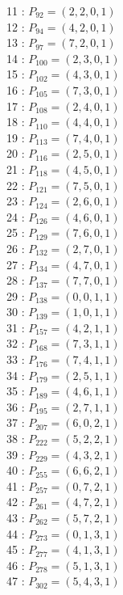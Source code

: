 \documentclass{article}
\begin{document}
{\begin{multicols}{3}
11 : $P_{92}=( 2, 2, 0, 1 )$\\
12 : $P_{94}=( 4, 2, 0, 1 )$\\
13 : $P_{97}=( 7, 2, 0, 1 )$\\
14 : $P_{100}=( 2, 3, 0, 1 )$\\
15 : $P_{102}=( 4, 3, 0, 1 )$\\
16 : $P_{105}=( 7, 3, 0, 1 )$\\
17 : $P_{108}=( 2, 4, 0, 1 )$\\
18 : $P_{110}=( 4, 4, 0, 1 )$\\
19 : $P_{113}=( 7, 4, 0, 1 )$\\
20 : $P_{116}=( 2, 5, 0, 1 )$\\
21 : $P_{118}=( 4, 5, 0, 1 )$\\
22 : $P_{121}=( 7, 5, 0, 1 )$\\
23 : $P_{124}=( 2, 6, 0, 1 )$\\
24 : $P_{126}=( 4, 6, 0, 1 )$\\
25 : $P_{129}=( 7, 6, 0, 1 )$\\
26 : $P_{132}=( 2, 7, 0, 1 )$\\
27 : $P_{134}=( 4, 7, 0, 1 )$\\
28 : $P_{137}=( 7, 7, 0, 1 )$\\
29 : $P_{138}=( 0, 0, 1, 1 )$\\
30 : $P_{139}=( 1, 0, 1, 1 )$\\
31 : $P_{157}=( 4, 2, 1, 1 )$\\
32 : $P_{168}=( 7, 3, 1, 1 )$\\
33 : $P_{176}=( 7, 4, 1, 1 )$\\
34 : $P_{179}=( 2, 5, 1, 1 )$\\
35 : $P_{189}=( 4, 6, 1, 1 )$\\
36 : $P_{195}=( 2, 7, 1, 1 )$\\
37 : $P_{207}=( 6, 0, 2, 1 )$\\
38 : $P_{222}=( 5, 2, 2, 1 )$\\
39 : $P_{229}=( 4, 3, 2, 1 )$\\
40 : $P_{255}=( 6, 6, 2, 1 )$\\
41 : $P_{257}=( 0, 7, 2, 1 )$\\
42 : $P_{261}=( 4, 7, 2, 1 )$\\
43 : $P_{262}=( 5, 7, 2, 1 )$\\
44 : $P_{273}=( 0, 1, 3, 1 )$\\
45 : $P_{277}=( 4, 1, 3, 1 )$\\
46 : $P_{278}=( 5, 1, 3, 1 )$\\
47 : $P_{302}=( 5, 4, 3, 1 )$\\

\end{multicols}}
\end{document}
